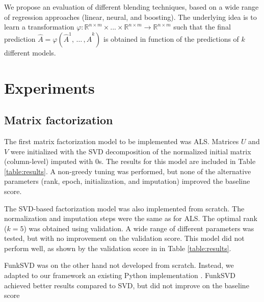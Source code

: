 \documentclass[sigconf]{acmart}
\begin{document}
We propose an evaluation of different blending techniques, based on a wide range of regression approaches (linear, neural, and boosting). 
The underlying idea is to learn a transformation $\varphi:\mathbb{R}^{n\times m}\times ... \times \mathbb{R}^{n\times m} \rightarrow \mathbb{R}^{n\times m}$
such that the final prediction $\hat{A} = \varphi(\hat{A}^1,\, \dots \,, \hat{A}^k)$ is obtained in function of the predictions of $k$ different models.

\section{Experiments}
\label{sect:exp}
\subsection{Matrix factorization}
The first matrix factorization model to be implemented was ALS. 
Matrices $U$ and $V$ were initialized with the SVD decomposition of the normalized initial matrix (column-level) imputed with 0s.
The results for this model are included in Table \ref{table:results}.
A non-greedy tuning was performed, but none of the alternative parameters (rank, epoch, initialization, and imputation) improved the baseline score. 

The SVD-based factorization model was also implemented from scratch. The normalization and imputation steps were the same as for ALS. The optimal rank ($k=5$) was obtained using validation. 
A wide range of different parameters was tested, but with no improvement on the validation score. 
This model did not perform well, as shown by the validation score in in Table \ref{table:results}.

FunkSVD was on the other hand not developed from scratch. Instead, we adapted to our framework an existing Python implementation \cite{bolmier}. 
FunkSVD achieved better results compared to SVD, but did not improve on the baseline score
\end{document}
